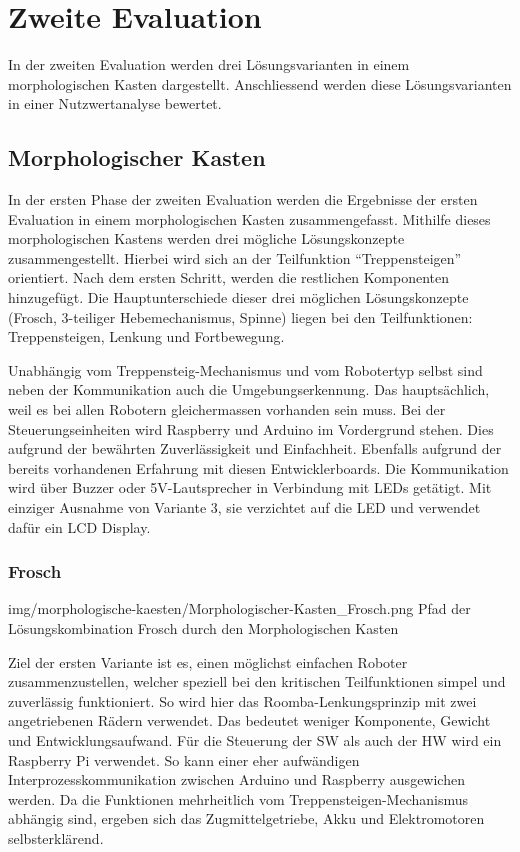 \section{Zweite Evaluation}
In der zweiten Evaluation werden drei Lösungsvarianten in einem morphologischen Kasten dargestellt. Anschliessend werden diese Lösungsvarianten in einer Nutzwertanalyse bewertet.
\subsection{Morphologischer Kasten}
In der ersten Phase der zweiten Evaluation werden die Ergebnisse der ersten Evaluation in einem morphologischen Kasten zusammengefasst. Mithilfe dieses morphologischen Kastens werden drei mögliche Lösungskonzepte zusammengestellt. Hierbei wird sich an der Teilfunktion ``Treppensteigen'' orientiert. Nach dem ersten Schritt, werden die restlichen Komponenten hinzugefügt. Die Hauptunterschiede dieser drei möglichen Lösungskonzepte (Frosch, 3-teiliger Hebemechanismus, Spinne) liegen bei den Teilfunktionen: Treppensteigen, Lenkung und Fortbewegung.

Unabhängig vom Treppensteig-Mechanismus und vom Robotertyp selbst sind neben der Kommunikation auch die Umgebungserkennung. Das hauptsächlich, weil es bei allen Robotern gleichermassen vorhanden sein muss. Bei der Steuerungseinheiten wird Raspberry und Arduino im Vordergrund stehen. Dies aufgrund der bewährten Zuverlässigkeit und Einfachheit. Ebenfalls aufgrund der bereits vorhandenen Erfahrung mit diesen Entwicklerboards. Die Kommunikation wird über Buzzer oder 5V-Lautsprecher in Verbindung mit LEDs getätigt. Mit einziger Ausnahme von Variante 3, sie verzichtet auf die LED und verwendet dafür ein LCD Display.

\subsubsection{Frosch}
\image
   {img/morphologische-kaesten/Morphologischer-Kasten_Frosch.png}
   {Pfad der Lösungskombination Frosch durch den Morphologischen Kasten}
   
Ziel der ersten Variante ist es, einen möglichst einfachen Roboter zusammenzustellen, welcher speziell bei den kritischen Teilfunktionen simpel und zuverlässig funktioniert. So wird hier das Roomba-Lenkungsprinzip mit zwei angetriebenen Rädern verwendet. Das bedeutet weniger Komponente, Gewicht und Entwicklungsaufwand. 
Für die  Steuerung der SW als auch der HW wird ein Raspberry Pi verwendet. So kann einer eher aufwändigen Interprozesskommunikation zwischen Arduino und Raspberry ausgewichen werden. 
Da die Funktionen mehrheitlich vom Treppensteigen-Mechanismus abhängig sind, ergeben sich das Zugmittelgetriebe, Akku und Elektromotoren selbsterklärend. 

